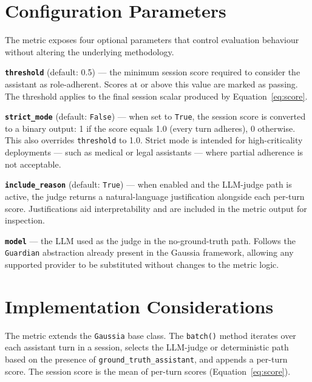 \documentclass[11pt,a4paper]{article}
\begin{document}
\section{Configuration Parameters}

The metric exposes four optional parameters that control evaluation behaviour
without altering the underlying methodology.

\textbf{\texttt{threshold}} (default: 0.5) --- the minimum session score
required to consider the assistant as role-adherent. Scores at or above this
value are marked as passing. The threshold applies to the final session scalar
produced by Equation~\ref{eq:score}.

\textbf{\texttt{strict\_mode}} (default: \texttt{False}) --- when set to
\texttt{True}, the session score is converted to a binary output: 1 if the
score equals 1.0 (every turn adheres), 0 otherwise. This also overrides
\texttt{threshold} to 1.0. Strict mode is intended for high-criticality
deployments --- such as medical or legal assistants --- where partial adherence
is not acceptable.

\textbf{\texttt{include\_reason}} (default: \texttt{True}) --- when enabled
and the LLM-judge path is active, the judge returns a natural-language
justification alongside each per-turn score. Justifications aid interpretability
and are included in the metric output for inspection.

\textbf{\texttt{model}} --- the LLM used as the judge in the no-ground-truth
path. Follows the \texttt{Guardian} abstraction already present in the Gaussia
framework, allowing any supported provider to be substituted without changes
to the metric logic.

\section{Implementation Considerations}

The metric extends the \texttt{Gaussia} base class. The \texttt{batch()}
method iterates over each assistant turn in a session, selects the
LLM-judge or deterministic path based on the presence of
\texttt{ground\_truth\_assistant}, and appends a per-turn score. The session
score is the mean of per-turn scores (Equation~\ref{eq:score}).
\end{document}
